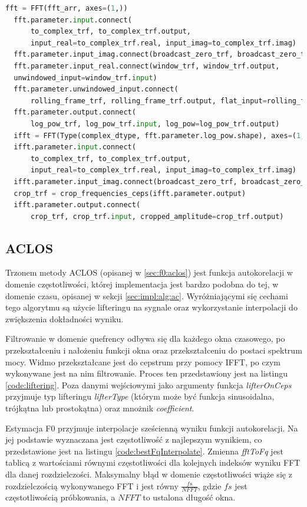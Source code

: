 \documentclass[12pt,a4paper,twoside]{mwart}
\begin{document}
\begin{lstlisting}[float, language=Python, caption={Proces wyliczania cepstrum przy użyciu GPU}, captionpos=b, label={code:cepsF0Gpu}]
  fft = FFT(fft_arr, axes=(1,))
  fft.parameter.input.connect(
      to_complex_trf, to_complex_trf.output,
      input_real=to_complex_trf.real, input_imag=to_complex_trf.imag)
  fft.parameter.input_imag.connect(broadcast_zero_trf, broadcast_zero_trf.output)
  fft.parameter.input_real.connect(window_trf, window_trf.output,
  unwindowed_input=window_trf.input)
  fft.parameter.unwindowed_input.connect(
      rolling_frame_trf, rolling_frame_trf.output, flat_input=rolling_frame_trf.input)
  fft.parameter.output.connect(
      log_pow_trf, log_pow_trf.input, log_pow=log_pow_trf.output)
  ifft = FFT(Type(complex_dtype, fft.parameter.log_pow.shape), axes=(1,))
  ifft.parameter.input.connect(
      to_complex_trf, to_complex_trf.output,
      input_real=to_complex_trf.real, input_imag=to_complex_trf.imag)
  ifft.parameter.input_imag.connect(broadcast_zero_trf, broadcast_zero_trf.output)
  crop_trf = crop_frequencies_ceps(ifft.parameter.output)
  ifft.parameter.output.connect(
      crop_trf, crop_trf.input, cropped_amplitude=crop_trf.output)
\end{lstlisting}

\subsection{ACLOS}\label{sec:impl:alg:aclos}
Trzonem metody ACLOS (opisanej w \ref{sec:f0:aclos}) jest funkcja autokorelacji w domenie częstotliwości, której implementacja jest bardzo podobna do tej, w domenie czasu, opisanej w sekcji \ref{sec:impl:alg:ac}. Wyróżniającymi się cechami tego algorytmu są użycie lifteringu na sygnale oraz wykorzystanie interpolacji do zwiększenia dokładności wyniku.   

Filtrowanie w domenie quefrency odbywa się dla każdego okna czasowego, po przekształceniu i nałożeniu funkcji okna oraz przekształceniu do postaci spektrum mocy. Widmo przekształcane jest do cepstrum przy pomocy IFFT, po czym wykonywane jest na nim filtrowanie. Proces ten przedstawiony jest na listingu \ref{code:liftering}. Poza danymi wejściowymi jako argumenty funkcja \textit{lifterOnCeps} przyjmuje typ lifteringu \textit{lifterType} (którym może być funkcja sinusoidalna, trójkątna lub prostokątna) oraz mnożnik \textit{coefficient}.

Estymacja F0 przyjmuje interpolacje sześcienną wyniku funkcji autokorelacji. Na jej podstawie wyznaczana jest częstotliwość z najlepszym wynikiem, co przedstawione jest na listingu \ref{code:bestFqInterpolate}. Zmienna \textit{fftToFq} jest tablicą z wartościami równymi częstotliwości dla kolejnych indeksów wyniku FFT dla danej rozdzielczości. Maksymalny błąd w domenie częstotliwości wiąże się z rozdzielczością wykonywanego FFT i jest równy $\frac{fs}{NFFT}$, gdzie $fs$ jest częstotliwością próbkowania, a $NFFT$ to ustalona długość okna. 
\end{document}
